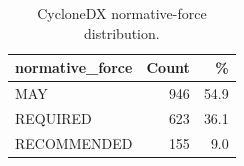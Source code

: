 \begin{table}[t]
\caption{CycloneDX normative-force distribution.}
\label{tab:cdx-normative-force}
\centering
\small
\begin{tabularx}{\columnwidth}{@{}Xrr@{}}
\toprule
\textbf{normative\_force} & \textbf{Count} & \textbf{\%} \\
\midrule
MAY & 946 & 54.9 \\
REQUIRED & 623 & 36.1 \\
RECOMMENDED & 155 & 9.0 \\
\bottomrule
\end{tabularx}
\end{table}
